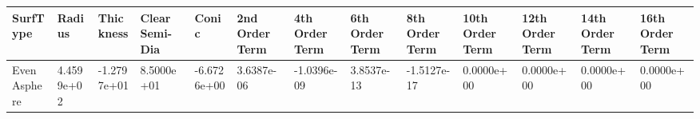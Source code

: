 \documentclass[convert={convertexe={magick.exe}}]{standalone}
\begin{document}
\begin{tabular}{lllllllllllll}
\toprule
    SurfType &     Radius &   Thickness &  Clear Semi-Dia &       Conic &  2nd Order Term &  4th Order Term &  6th Order Term &  8th Order Term &  10th Order Term &  12th Order Term &  14th Order Term &  16th Order Term \\
\midrule
Even Asphere & 4.4599e+02 & -1.2797e+01 &      8.5000e+01 & -6.6726e+00 &      3.6387e-06 &     -1.0396e-09 &      3.8537e-13 &     -1.5127e-17 &       0.0000e+00 &       0.0000e+00 &       0.0000e+00 &       0.0000e+00 \\
\bottomrule
\end{tabular}
\end{document}
